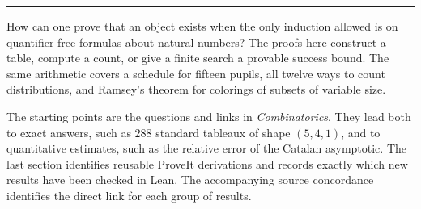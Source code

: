 \documentclass[10pt,letterpaper]{article}
\theoremstyle{research}
\begin{document}
\thispagestyle{empty}
\par\vspace{.55em}
\par\vspace{.7em}
\noindent\rule{\linewidth}{.55pt}\par\vspace{.2em}
\noindent How can one prove that an object exists when the only induction allowed is on quantifier-free formulas about natural numbers? The proofs here construct a table, compute a count, or give a finite search a provable success bound. The same arithmetic covers a schedule for fifteen pupils, all twelve ways to count distributions, and Ramsey's theorem for colorings of subsets of variable size.

\noindent The starting points are the questions and links in \emph{Combinatorics}. They lead both to exact answers, such as $288$ standard tableaux of shape $(5,4,1)$, and to quantitative estimates, such as the relative error of the Catalan asymptotic. The last section identifies reusable ProveIt derivations and records exactly which new results have been checked in Lean. The accompanying source concordance identifies the direct link for each group of results.\par\vspace{.2em}
\tableofcontents
\clearpage















\end{document}
